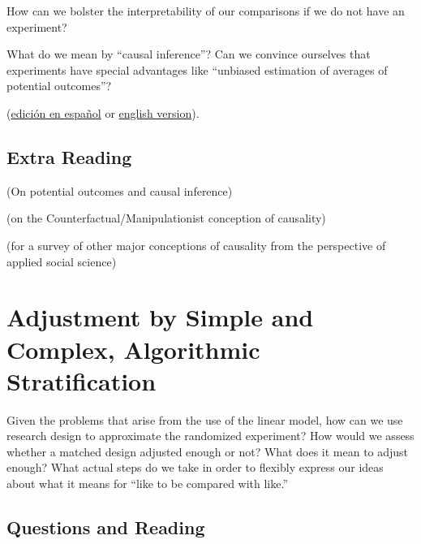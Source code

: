 \documentclass[10pt,letterpaper]{article}
\begin{document}


How can we bolster the interpretability of our comparisons if we do not have
an experiment? 


What do we mean by ``causal inference''? Can we convince ourselves that
experiments have special advantages like ``unbiased estimation of averages of
potential outcomes''?


(\href{https://egap.github.io/theory_and_practice_of_field_experiments_spanish/}{edición en español} or \href{https://egap.github.io/theory_and_practice_of_field_experiments/}{english version}).

\subsection{Extra Reading}

 (On potential outcomes and causal
inference)


 (on the Counterfactual/Manipulationist conception of
causality)

 (for a survey of other major conceptions of causality from
the perspective of applied social science)



\AdvanceDate[1]
\section{Adjustment by Simple and Complex, Algorithmic Stratification }

Given the problems that arise from the use of the linear model, how can we use
research design to approximate the randomized experiment? How would we assess
whether a matched design adjusted enough or not? What does it mean to adjust
enough? What actual steps do we take in order to flexibly express our ideas
about what it means for ``like to be compared with like.''

\subsection{Questions and Reading}
\end{document}
